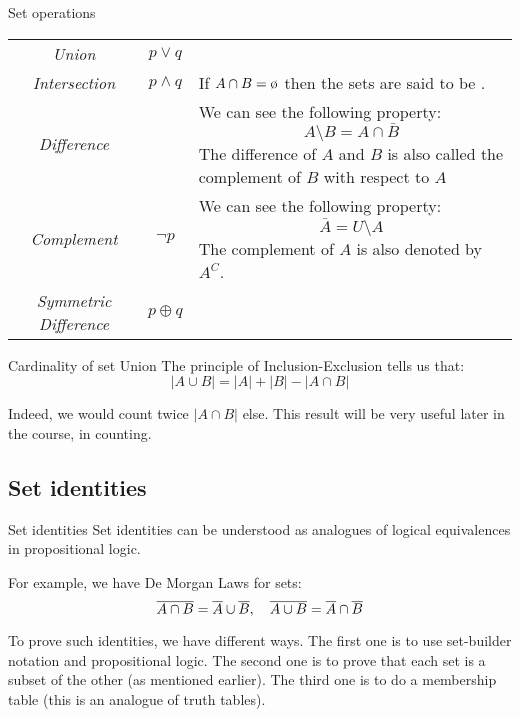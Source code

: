 \documentclass[a4paper]{article}
\begin{document}
\begin{parag}{Set operations}
    \begin{center}
    \begin{tabularx}{\linewidth}{|>{\hsize}C>{\hsize}C>{\hsize}X|}
        \hline
         &  &  \\
        \hline
        \textit{Union} & $p \lor q$ & \\
        \hline
        \textit{Intersection} & $p \land q$ & If $A \cap B = \o$ then the sets are said to be . \\
        \hline
        \textit{Difference} &  & We can see the following property:
        \[A \setminus B = A \cap \bar{B}\]
        The difference of $A$ and $B$ is also called the complement of $B$ with respect to $A$  \\
        \hline
        \textit{Complement} & $\lnot p$ & We can see the following property:
        \[\bar{A} = U \setminus A\]
        The complement of $A$ is also denoted by $A^C$. \\
        \hline
        \textit{Symmetric \mbox{Difference}} & $p \oplus q$ &  \\
        \hline
    \end{tabularx}
    \end{center}

\end{parag}

\begin{parag}{Cardinality of set Union}
    The principle of Inclusion-Exclusion tells us that:
    \[\left|A \cup B\right| = \left|A\right| + \left|B\right| - \left|A \cap B\right|\]

    Indeed, we would count twice $\left|A \cap B \right|$ else. This result will be very useful later in the course, in counting.
\end{parag}


\subsection{Set identities}
\begin{parag}{Set identities}
    Set identities can be understood as analogues of logical equivalences in propositional logic.

    For example, we have De Morgan Laws for sets:
    \[\overline{A \cap B} = \overline{A} \cup \overline{B}, \quad \overline{A \cup B} = \overline{A} \cap \overline{B}\]

    To prove such identities, we have different ways. The first one is to use set-builder notation and propositional logic. The second one is to prove that each set is a subset of the other (as mentioned earlier). The third one is to do a membership table (this is an analogue of truth tables).
\end{parag}
\end{document}
